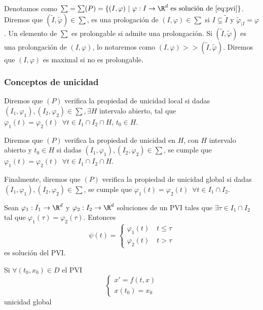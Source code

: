\documentclass{article}
\begin{document}
  Denotamos como
  $\sum = \sum(P) = \{(I, \varphi) \ | \ \varphi: I \to \R^d \text{ es solución de \eqref{eq:pvi}}\}$. Diremos que
  $(\widetilde{I}, \widetilde{\varphi}) \in \sum$, es una prologación de $(I, \varphi) \in \sum$ si
  $I \subsetneq \widetilde{I}$ y $\widetilde{\varphi}_{|I} = \varphi$.  Un elemento de $\sum$ es prolongable
  si admite una prolongación. Si $(\widetilde{I}, \widetilde{\varphi})$ es una prolongación de
  $(I, \varphi)$, lo notaremos como $(I, \varphi) >> (\widetilde{I}, \tilde{\varphi})$. Diremos que
  $(I, \varphi)$ es maximal si no es prolongable.

  \subsubsection{Conceptos de unicidad}

  Diremos que $(P)$ verifica la propiedad de unicidad local si dadas
  $(I_1, \varphi_1), (I_2, \varphi_2) \in \sum, \exists H$ intervalo abierto, tal que
  $\varphi_1(t) = \varphi_2(t)\,\,\, \forall t \in I_1 \cap I_2 \cap H$, $t_0 \in H$.

  Diremos que $(P)$ verifica la propiedad de unicidad en $H$, con $H$ intervalo abierto y
  $t_0 \in H$ si dadas $(I_1, \varphi_1), (I_2, \varphi_2) \in \sum$, se cumple que
  $\varphi_1(t) = \varphi_2(t)\,\,\, \forall t \in I_1 \cap I_2 \cap H$.

  Finalmente, diremos que $(P)$ verifica la propiedad de unicidad global si dadas
  $(I_1, \varphi_1), (I_2, \varphi_2) \in \sum$, se cumple que
  $\varphi_1(t) = \varphi_2(t)\,\,\, \forall t \in I_1 \cap I_2$.

\begin{lem}
  Sean $\varphi_1: I_1 \to \R^d$ y $\varphi_2: I_2 \to \R^d$ soluciones de un PVI tales que
  $\exists \tau \in I_1 \cap I_2$ tal que $\varphi_1(\tau) = \varphi_2(\tau)$.  Entonces
  \[
    \psi(t) = \left\{
      \begin{array}{l}
        \varphi_1(t) \quad t \leq \tau \\
        \varphi_2(t) \quad t > \tau
      \end{array}
    \right.
  \]
  es solución del PVI.
\end{lem}

\begin{lem}
  Si $\forall (t_0, x_0) \in D$ el PVI
  \[
    \left\{
      \begin{array}{l}
        x' = f(t,x) \\
        x(t_0) = x_0
      \end{array}
    \right.
  \]
  unicidad global
\end{lem}
\end{document}
